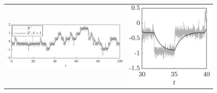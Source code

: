 \documentclass[review,onefignum,onetabnum]{siamonline190516}
\begin{document}
\begin{figure}[t]
	\centering
	\begin{tabular}{cc}
		\includegraphics[]{Figures/TrajD1} & \includegraphics[]{Figures/TrajD1Z}\\

\end{tabular}
\end{figure}
\end{document}
